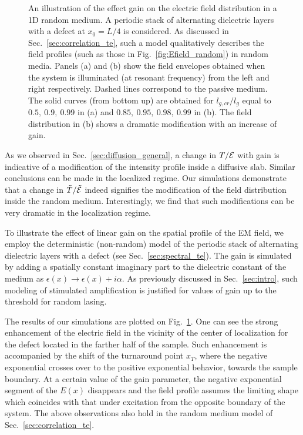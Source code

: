 \begin{figure}
\caption[An illustration of the effect gain on the electric field distribution in a 1D random medium.]{An illustration of the effect gain on the electric field distribution in a 1D random medium. A periodic stack of alternating dielectric layers with a defect at $x_0=L/4$ is considered. As discussed in Sec.~\ref{sec:correlation_te}, such a model qualitatively describes the field profiles (such as those in Fig.~\ref{fig:Efield_random}) in random media. Panels (a) and (b) show the field envelopes obtained when the system is illuminated (at resonant frequency) from the left and right respectively. Dashed lines correspond to the passive medium. The solid curves (from bottom up) are obtained for $l_{g,cr}/l_g$ equal to $0.5,\ 0.9,\ 0.99$ in (a) and $0.85,\ 0.95,\ 0.98,\ 0.99$ in (b). The field distribution in (b) shows a dramatic modification with an increase of gain.\label{fig:localization_gain}}
\end{figure}

As we observed in Sec.~\ref{sec:diffusion_general}, a change in $T/{\cal E}$ with gain is indicative of a modification of the intensity profile inside a diffusive slab. Similar conclusions can be made in the localized regime. Our simulations demonstrate that a change in $\tilde{T}/\tilde{\cal E}$ indeed signifies the modification of the field distribution inside the random medium. Interestingly, we find that such modifications can be very dramatic in the localization regime. 

To illustrate the effect of linear gain on the spatial profile of the EM field, we employ the deterministic (non-random) model of the periodic stack of alternating dielectric layers with a defect (see Sec.~\ref{sec:spectral_te}). The gain is simulated by adding a spatially constant imaginary part to the dielectric constant of the medium  as $\epsilon(x)\rightarrow\epsilon(x)+i\alpha$. As previously discussed in Sec.~\ref{sec:intro}, such modeling of stimulated amplification is justified for values of gain up to the threshold for random lasing.

The results of our simulations are plotted on Fig.~\ref{fig:localization_gain}. One can see the strong enhancement of the electric field in the vicinity of the center of localization for the defect located in the farther half of the sample. Such enhancement is accompanied by the shift of the turnaround point $x_T$, where the negative exponential crosses over to the positive exponential behavior, towards the sample boundary. At a certain value of the gain parameter, the negative exponential segment of the $E(x)$ disappears and the field profile assumes the limiting shape which coincides with that under excitation from the opposite boundary of the system. The above observations also hold in the random medium model of Sec.~\ref{sec:correlation_te}. 

